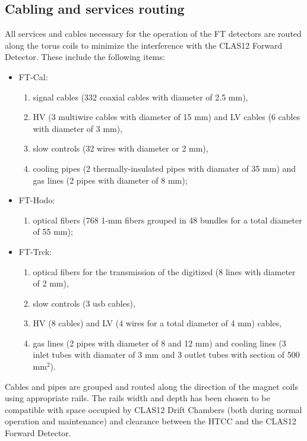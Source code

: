 \subsection{Cabling and services routing}
All services and cables necessary for the operation of the FT detectors are routed along the torus coils to minimize the interference with the CLAS12 Forward Detector. These include the following items:
\begin{itemize}
\item{FT-Cal:}
\begin{enumerate}
\item{signal cables (332 coaxial cables with diameter of 2.5 mm),}
\item{HV (3 multiwire cables with diameter of 15 mm) and LV cables (6 cables with diameter of 3 mm),}
\item{slow controls (32 wires with diameter or 2 mm),}
\item{cooling pipes (2 thermally-insulated pipes with diamater of 35 mm) and gas lines (2 pipes with diameter of 8 mm);}
\end{enumerate}
\item{FT-Hodo:}
\begin{enumerate}
\item{optical fibers (768 1-mm fibers grouped in 48 bundles for a total diameter of 55 mm);}
\end{enumerate}
\item{FT-Trck:}
\begin{enumerate}
\item{optical fibers for the transmission of the digitized (8 lines with diameter of 2 mm),}
\item{slow controls (3 usb cables),}
\item{HV (8 cables) and LV (4 wires for a total diameter of 4 mm) cables,}
\item{gas lines (2 pipes with diameter of 8 and 12 mm) and cooling lines (3 inlet tubes with diamater of 3 mm and 3 outlet tubes with section of 500 mm$^2$).}
\end{enumerate}
\end{itemize}


Cables and pipes are grouped and routed along the direction of the magnet coils using appropriate rails. The rails width and depth has been chosen
to be compatible with  space occupied by  CLAS12 Drift Chambers (both during normal operation  and maintenance) and clearance between the HTCC and the CLAS12 Forward Detector. 

